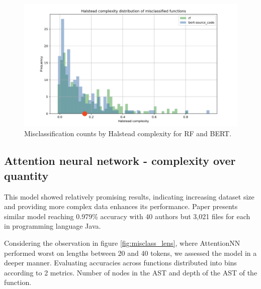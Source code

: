 \documentclass[conference]{IEEEtran}
\begin{document}
\begin{figure}[H]
    \centering
    \hspace*{-25pt}\includegraphics[width=1.2\columnwidth]{figures/misclass_hs.png}
\caption{Misclassification counts by Halstead complexity for RF and BERT.}
    \label{fig:misclass_halstead}
\end{figure}

\subsection{Attention neural network - complexity over quantity}  \label{subsec:comp_over_quant}

This model showed relatively promising results, indicating increasing dataset size and providing more complex data enhances its performance.
Paper \citet{pbnn} presents similar model reaching 0.979\% accuracy with 40 authors but 3,021 files for each in programming language Java.

Considering the observation in figure \ref{fig:misclass_lens}, where AttentionNN performed worst on lengths between 20 and 40 tokens,
we assessed the model in a deeper manner. Evaluating accuracies across functions distributed into bins according to 2 metrics. 
Number of nodes in the AST and depth of the AST of the function. 
\end{document}
